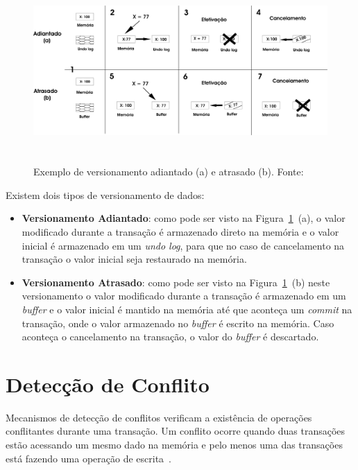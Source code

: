 \documentclass[ti]{texufpel} %
\begin{document}
\begin{figure}[!htp]
\centering
\includegraphics[height=7cm]{Imagens/versionamento.png}
\caption{Exemplo de versionamento adiantado (a) e atrasado (b). Fonte:~\cite{baldassinTese09}}
\label{figuraVersionamento}
\end{figure}

Existem dois tipos de versionamento de dados:

\begin{itemize}
 \item \textbf{Versionamento Adiantado}: como pode ser visto na Figura~\ref{figuraVersionamento}~(a), o valor modificado durante a transação é armazenado direto na memória e o valor inicial é armazenado em um \emph{undo log}, para que no caso de cancelamento na transação o valor inicial seja restaurado na memória.

 \item \textbf{Versionamento Atrasado}: como pode ser visto na Figura~\ref{figuraVersionamento}~(b) neste versionamento o valor modificado durante a transação é armazenado em um \emph{buffer} e o valor inicial é mantido na memória até que aconteça um \emph{commit} na transação, onde o valor armazenado no \emph{buffer} é escrito na memória. Caso aconteça o cancelamento na transação, o valor do \emph{buffer} é descartado.
\end{itemize}

\section{Detecção de Conflito}

Mecanismos de detecção de conflitos verificam a existência de operações conflitantes durante uma transação. Um conflito ocorre quando duas transações estão acessando um mesmo dado na memória e pelo menos uma das transações está fazendo uma operação de escrita~\cite{baldassinTese09}.
\end{document}

